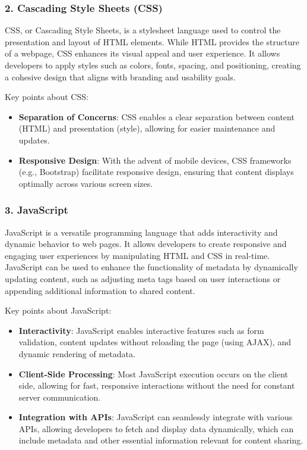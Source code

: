 \subsubsection{2. Cascading Style Sheets (CSS)}

CSS, or Cascading Style Sheets, is a stylesheet language used to control the presentation and layout of HTML elements. While HTML provides the structure of a webpage, CSS enhances its visual appeal and user experience. It allows developers to apply styles such as colors, fonts, spacing, and positioning, creating a cohesive design that aligns with branding and usability goals.

Key points about CSS:
\begin{itemize}
    \item \textbf{Separation of Concerns}: CSS enables a clear separation between content (HTML) and presentation (style), allowing for easier maintenance and updates.
    \item \textbf{Responsive Design}: With the advent of mobile devices, CSS frameworks (e.g., Bootstrap) facilitate responsive design, ensuring that content displays optimally across various screen sizes.
\end{itemize}

\subsubsection{3. JavaScript}

JavaScript is a versatile programming language that adds interactivity and dynamic behavior to web pages. It allows developers to create responsive and engaging user experiences by manipulating HTML and CSS in real-time. JavaScript can be used to enhance the functionality of metadata by dynamically updating content, such as adjusting meta tags based on user interactions or appending additional information to shared content.

Key points about JavaScript:
\begin{itemize}
    \item \textbf{Interactivity}: JavaScript enables interactive features such as form validation, content updates without reloading the page (using AJAX), and dynamic rendering of metadata.
    \item \textbf{Client-Side Processing}: Most JavaScript execution occurs on the client side, allowing for fast, responsive interactions without the need for constant server communication.
    \item \textbf{Integration with APIs}: JavaScript can seamlessly integrate with various APIs, allowing developers to fetch and display data dynamically, which can include metadata and other essential information relevant for content sharing.
\end{itemize}

